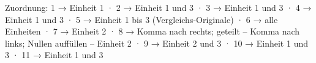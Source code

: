 
Zuordnung: 1 → Einheit 1 · 2 → Einheit 1 und 3 · 3 → Einheit 1 und 3 · 4 → Einheit 1 und 3 · 5 → Einheit 1 bis 3 (Vergleichs-Originale) · 6 → alle Einheiten · 7 → Einheit 2 · 8 → Komma nach rechts; geteilt – Komma nach links; Nullen auffüllen – Einheit 2 · 9 → Einheit 2 und 3 · 10 → Einheit 1 und 3 · 11 → Einheit 1 und 3

